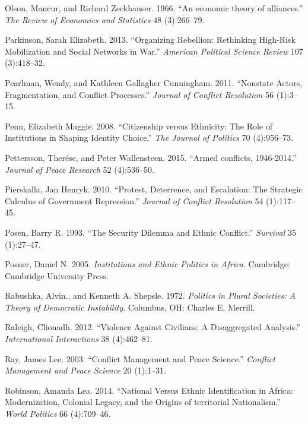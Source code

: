 \documentclass[12pt,]{book}
\theoremstyle{definition}
\theoremstyle{definition}
\theoremstyle{definition}
\theoremstyle{remark}
\begin{document}
\leavevmode\hypertarget{ref-Olson1966}{}%
Olson, Mancur, and Richard Zeckhauser. 1966. ``An economic theory of
alliances.'' \emph{The Review of Economics and Statistics} 48
(3):266--79.

\leavevmode\hypertarget{ref-Parkinson2013c}{}%
Parkinson, Sarah Elizabeth. 2013. ``Organizing Rebellion: Rethinking
High-Risk Mobilization and Social Networks in War.'' \emph{American
Political Science Review} 107 (3):418--32.

\leavevmode\hypertarget{ref-Pearlman2011}{}%
Pearlman, Wendy, and Kathleen Gallagher Cunningham. 2011. ``Nonstate
Actors, Fragmentation, and Conflict Processes.'' \emph{Journal of
Conflict Resolution} 56 (1):3--15.

\leavevmode\hypertarget{ref-Penn2008}{}%
Penn, Elizabeth Maggie. 2008. ``Citizenship versus Ethnicity: The Role
of Institutions in Shaping Identity Choice.'' \emph{The Journal of
Politics} 70 (4):956--73.

\leavevmode\hypertarget{ref-Pettersson2015a}{}%
Pettersson, Therése, and Peter Wallensteen. 2015. ``Armed conflicts,
1946-2014.'' \emph{Journal of Peace Research} 52 (4):536--50.

\leavevmode\hypertarget{ref-Pierskalla2010}{}%
Pierskalla, Jan Henryk. 2010. ``Protest, Deterrence, and Escalation: The
Strategic Calculus of Government Repression.'' \emph{Journal of Conflict
Resolution} 54 (1):117--45.

\leavevmode\hypertarget{ref-Posen1993}{}%
Posen, Barry R. 1993. ``The Security Dilemma and Ethnic Conflict.''
\emph{Survival} 35 (1):27--47.

\leavevmode\hypertarget{ref-Posner2005}{}%
Posner, Daniel N. 2005. \emph{Institutions and Ethnic Politics in
Africa}. Cambridge: Cambridge University Press.

\leavevmode\hypertarget{ref-Rabushka1972}{}%
Rabushka, Alvin., and Kenneth A. Shepsle. 1972. \emph{Politics in Plural
Societies: A Theory of Democratic Instability}. Columbus, OH: Charles E.
Merrill.

\leavevmode\hypertarget{ref-Raleigh2012a}{}%
Raleigh, Clionadh. 2012. ``Violence Against Civilians: A Disaggregated
Analysis.'' \emph{International Interactions} 38 (4):462--81.

\leavevmode\hypertarget{ref-Ray2003}{}%
Ray, James Lee. 2003. ``Conflict Management and Peace Science.''
\emph{Conflict Management and Peace Science} 20 (1):1--31.

\leavevmode\hypertarget{ref-Robinson2014}{}%
Robinson, Amanda Lea. 2014. ``National Versus Ethnic Identification in
Africa: Modernization, Colonial Legacy, and the Origins of territorial
Nationalism.'' \emph{World Politics} 66 (4):709--46.
\end{document}
